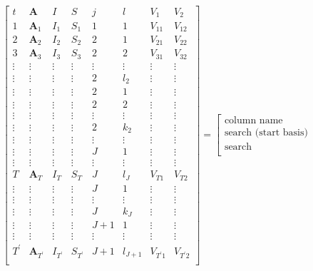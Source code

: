 \documentclass[12pt]{article}
\begin{document}
\begin{equation}
\left[
\begin{array}{c|ccc|cc|cc}
t & \mathbf{A} & I & S & j &  l  & V_{1} & V_{2}\\
\hline
1 & \mathbf{A}_1 & I_1 & S_1 & 1 & 1 & V_{11} & V_{12}\\
\hline
2 & \mathbf{A}_2 & I_2 & S_2 & 2 & 1  & V_{21}  & V_{22}\\
3 & \mathbf{A}_3 & I_3 & S_3 & 2 & 2  & V_{31}  & V_{32}\\
\vdots & \vdots &\vdots &\vdots  &\vdots & \vdots &\vdots  &\vdots\\
\vdots & \vdots & \vdots &\vdots & 2 & l_2 & \vdots  & \vdots\\
\hline
\vdots &\vdots & \vdots &\vdots & 2  & 1& \vdots & \vdots\\
\vdots &\vdots &\vdots &\vdots & 2 & 2& \vdots &  \vdots\\
\vdots &\vdots &\vdots &\vdots &\vdots & \vdots & \vdots  &\vdots \\
\vdots &\vdots &\vdots &\vdots & 2 & k_2 &\vdots  & \vdots\\
\hline
\vdots &\vdots &\vdots &\vdots &\vdots & \vdots &\vdots &\vdots \\
\hline
\vdots & \vdots & \vdots &\vdots  & J &  1 & \vdots & \vdots \\
\vdots &\vdots &\vdots &\vdots &\vdots & \vdots &\vdots &\vdots \\
T & \mathbf{A}_T & I_T &S_T  & J &  l_{J} & V_{T1}& V_{T2}\\
\hline
\vdots &\vdots & \vdots &\vdots & J  & 1& \vdots & \vdots\\
\vdots &\vdots &\vdots &\vdots &\vdots & \vdots & \vdots  &\vdots \\
\vdots &\vdots &\vdots &\vdots & J & k_J &\vdots  & \vdots\\
\hline
\vdots& \vdots & \vdots & \vdots & J+1 & 1 & \vdots& \vdots\\
\vdots &\vdots &\vdots &\vdots &\vdots & \vdots &\vdots &\vdots \\
T^\prime & \mathbf{A}_{T^\prime} & I_{T^\prime} &S_{T^\prime}  & J+1 &  l_{J+1} & V_{T^\prime 1}& V_{T^\prime 2}\\
\end{array}
\right]
= 
\left[
\begin{array}{c}
\text{column name} \\
\hline
\text{search (start basis)} \\
\hline
\text{search} \\

\end{array}
\end{equation}
\end{document}
